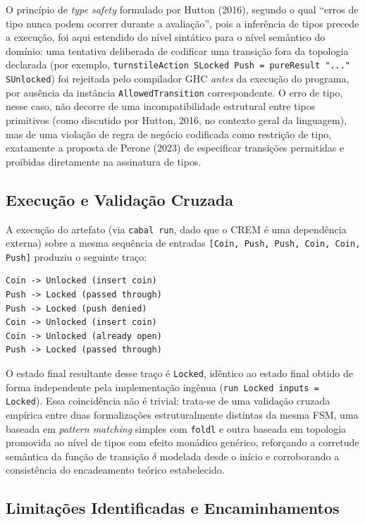 \documentclass[12pt,a4paper]{article}
\begin{document}
O princípio de \textit{type safety} formulado por Hutton (2016), segundo o qual ``erros de tipo nunca podem ocorrer durante a avaliação'', pois a inferência de tipos precede a execução, foi aqui estendido do nível sintático para o nível semântico do domínio: uma tentativa deliberada de codificar uma transição fora da topologia declarada (por exemplo, \texttt{turnstileAction SLocked Push = pureResult "..." SUnlocked}) foi rejeitada pelo compilador GHC \emph{antes} da execução do programa, por ausência da instância \texttt{AllowedTransition} correspondente. O erro de tipo, nesse caso, não decorre de uma incompatibilidade estrutural entre tipos primitivos (como discutido por Hutton, 2016, no contexto geral da linguagem), mas de uma violação de regra de negócio codificada como restrição de tipo, exatamente a proposta de Perone (2023) de especificar transições permitidas e proibidas diretamente na assinatura de tipos.

\subsection{Execução e Validação Cruzada}

A execução do artefato (via \texttt{cabal run}, dado que o CREM é uma dependência externa) sobre a mesma sequência de entradas \texttt{[Coin, Push, Push, Coin, Coin, Push]} produziu o seguinte traço:

\begin{verbatim}
Coin -> Unlocked (insert coin)
Push -> Locked (passed through)
Push -> Locked (push denied)
Coin -> Unlocked (insert coin)
Coin -> Unlocked (already open)
Push -> Locked (passed through)
\end{verbatim}

O estado final resultante desse traço é \texttt{Locked}, idêntico ao estado final obtido de forma independente pela implementação ingênua (\texttt{run Locked inputs = Locked}). Essa coincidência não é trivial: trata-se de uma validação cruzada empírica entre duas formalizações estruturalmente distintas da mesma FSM, uma baseada em \textit{pattern matching} simples com \texttt{foldl} e outra baseada em topologia promovida ao nível de tipos com efeito monádico genérico, reforçando a corretude semântica da função de transição $\delta$ modelada desde o início e corroborando a consistência do encadeamento teórico estabelecido.

\subsection{Limitações Identificadas e Encaminhamentos}
\end{document}
